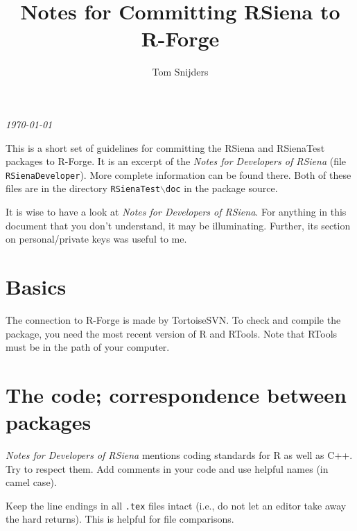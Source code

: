 \documentclass[12pt, a4paper]{article}
\renewcommand{\=}{\,=\,}
\newcommand{\+}{\,+\,}
\newcommand{\bs}{\backslash}
\begin{document}
\title{\vspace*{-0.5cm} Notes for Committing RSiena to R-Forge}
\author{Tom Snijders}
\date{}
\maketitle

\centerline{\emph{\today}}
\bigskip

This is a short set of guidelines for committing the RSiena and RSienaTest packages
to R-Forge. It is an excerpt of the \emph{Notes for Developers of RSiena}
(file \texttt{RSienaDeveloper}). More complete information can be found there.
Both of these files are in the directory \texttt{RSienaTest{$\bs$}doc}
in the package source.

It is wise to have a look at \emph{Notes for Developers of RSiena}.
For anything in this document that you don't understand, it may be illuminating.
Further, its section on personal/private keys was useful to me.


\section{Basics}

The connection to R-Forge is made by TortoiseSVN.
To check and compile the package, you need the most recent version of R
and RTools. Note that RTools must be in the path of your computer.

\section{The code; correspondence between packages}

\emph{Notes for Developers of RSiena} mentions coding standards for R as well as C++.
Try to respect them.
Add comments in your code and use helpful names (in camel case).

Keep the line endings in all \texttt{.tex} files intact (i.e., do not let
an editor take away the hard returns). This is helpful for file comparisons.
\end{document}
